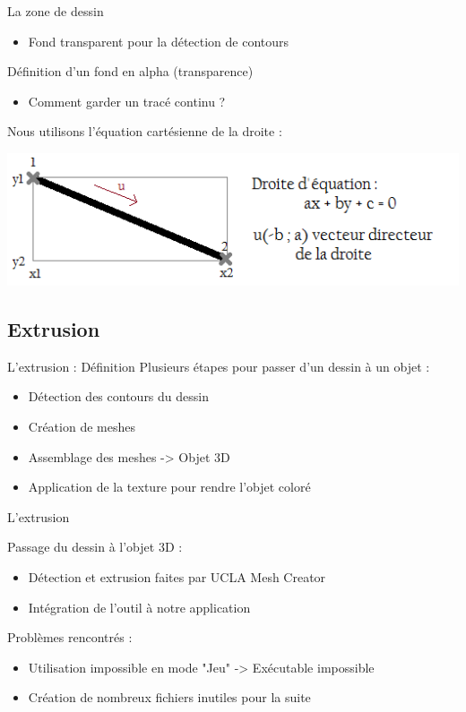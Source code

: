 \documentclass[a4paper,10pt]{beamer}
\begin{document}
	\begin{frame}{La zone de dessin}
			\begin{itemize}
				\item Fond transparent pour la détection de contours
			\end{itemize} 
			Définition d'un fond en alpha (transparence)
			\begin{itemize}
				\item Comment garder un tracé continu ?
			\end{itemize}
			Nous utilisons l'équation cartésienne de la droite :
			\centerline{\includegraphics[scale=0.6]{images/intro/trait.png}}
	\end{frame}
	\subsection{Extrusion}
	\begin{frame}{L'extrusion : Définition}
		Plusieurs étapes pour passer d'un dessin à un objet :
		\begin{itemize}
			\item Détection des contours du dessin
			\item Création de meshes
			\item Assemblage des meshes -> Objet 3D
			\item Application de la texture pour rendre l'objet coloré
		\end{itemize}
	
	\end{frame}
		
	\begin{frame}{L'extrusion}
		
		Passage du dessin à l'objet 3D :
		\begin{itemize}
			\item Détection et extrusion faites par UCLA Mesh Creator
			\item Intégration de l'outil à notre application
		\end{itemize}
		\medbreak
		Problèmes rencontrés :
		\begin{itemize}
			\item Utilisation impossible en mode "Jeu" -> Exécutable impossible
			\item Création de nombreux fichiers inutiles pour la suite
		\end{itemize}
	\end{frame}
\end{document}
